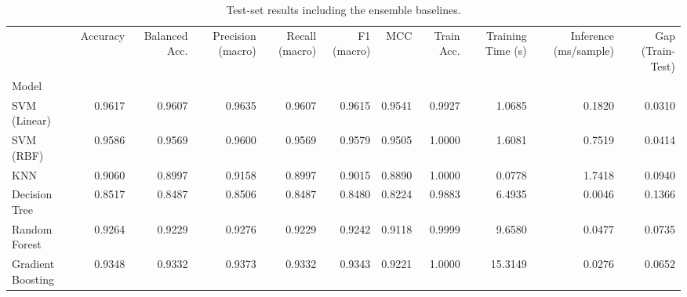 \begin{table}
\caption{Test-set results including the ensemble baselines.}
\label{tab:Ext02_test_results_with_ensembles}
\begin{tabular}{lrrrrrrrrrr}
\toprule
 & Accuracy & Balanced Acc. & Precision (macro) & Recall (macro) & F1 (macro) & MCC & Train Acc. & Training Time (s) & Inference (ms/sample) & Gap (Train-Test) \\
Model &  &  &  &  &  &  &  &  &  &  \\
\midrule
SVM (Linear) & 0.9617 & 0.9607 & 0.9635 & 0.9607 & 0.9615 & 0.9541 & 0.9927 & 1.0685 & 0.1820 & 0.0310 \\
SVM (RBF) & 0.9586 & 0.9569 & 0.9600 & 0.9569 & 0.9579 & 0.9505 & 1.0000 & 1.6081 & 0.7519 & 0.0414 \\
KNN & 0.9060 & 0.8997 & 0.9158 & 0.8997 & 0.9015 & 0.8890 & 1.0000 & 0.0778 & 1.7418 & 0.0940 \\
Decision Tree & 0.8517 & 0.8487 & 0.8506 & 0.8487 & 0.8480 & 0.8224 & 0.9883 & 6.4935 & 0.0046 & 0.1366 \\
Random Forest & 0.9264 & 0.9229 & 0.9276 & 0.9229 & 0.9242 & 0.9118 & 0.9999 & 9.6580 & 0.0477 & 0.0735 \\
Gradient Boosting & 0.9348 & 0.9332 & 0.9373 & 0.9332 & 0.9343 & 0.9221 & 1.0000 & 15.3149 & 0.0276 & 0.0652 \\
\bottomrule
\end{tabular}
\end{table}
